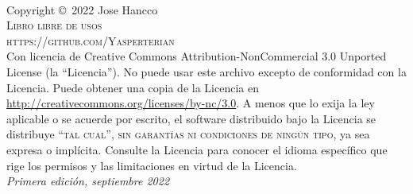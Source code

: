 \documentclass[
	12pt, %
	fleqn, %
	a4paper, %
	oneside, %
]{LegrandOrangeBook}
\begin{document}

\begingroup
\thispagestyle{empty} %
\vfill
\endgroup


\newpage
~\vfill
\thispagestyle{empty}

\noindent Copyright \copyright\ 2022 Jose Hancco\\ %

\noindent \textsc{Libro libre de usos}\\ %

\noindent \textsc{https://github.com/Yasperterian}\\ %

\noindent Con licencia de Creative Commons Attribution-NonCommercial 3.0 Unported License (la ``Licencia''). No puede usar este archivo excepto de conformidad con la Licencia. Puede obtener una copia de la Licencia en \url{http://creativecommons.org/licenses/by-nc/3.0}. A menos que lo exija la ley aplicable o se acuerde por escrito, el software distribuido bajo la Licencia se distribuye \textsc{``tal cual'', sin garantías ni condiciones de ningún tipo}, ya sea expresa o implícita. Consulte la Licencia para conocer el idioma específico que rige los permisos y las limitaciones en virtud de la Licencia.\\ %

\noindent \textit{Primera edición, septiembre 2022} %
\end{document}
